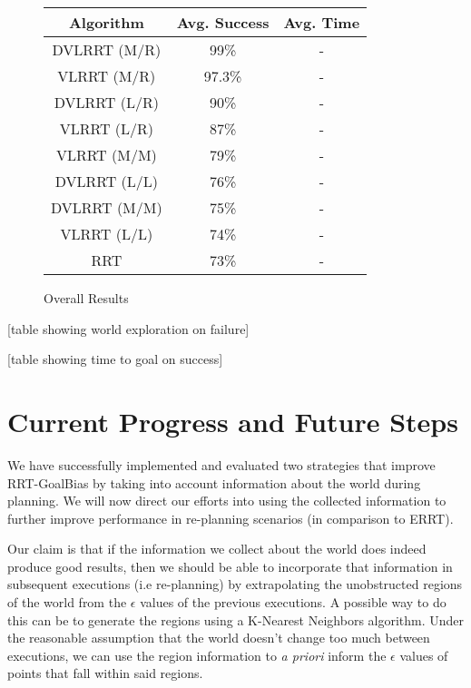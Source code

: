 \documentclass[10pt,twoside,twocolumn]{article}
\begin{document}
\begin{figure}[tp]
\small{
\begin{tabular}{|ccc|}
\hline
Algorithm & Avg. Success & Avg. Time\\
\hline
DVLRRT (M/R) & 99\% & -\\
VLRRT (M/R) & 97.3\% & -\\
DVLRRT (L/R) & 90\% & -\\
VLRRT (L/R) & 87\% & -\\
VLRRT (M/M) & 79\% & -\\
DVLRRT (L/L) & 76\% & -\\
DVLRRT (M/M) & 75\% & -\\
VLRRT (L/L) & 74\% & -\\
RRT & 73\% & -\\
\hline
\end{tabular}}
\caption{Overall Results}
\end{figure}


[table showing world exploration on failure]

[table showing time to goal on success]

\section{Current Progress and Future Steps}

We have successfully implemented and evaluated two strategies that improve RRT-GoalBias by
taking into account information about the world during planning. We will now
direct our efforts into using the collected information to further improve performance
in re-planning scenarios (in comparison to ERRT). 

Our claim is that if the information we collect
about the world does indeed produce good results, then we should be able to incorporate that
information in subsequent executions (i.e re-planning) by extrapolating the unobstructed regions of
the world from the $\epsilon$ values of the previous executions. A possible way to do this can be
to generate the regions using a K-Nearest Neighbors algorithm. Under the reasonable assumption
that the world doesn't change too much between executions, we can use the region information to
\emph{a priori} inform the $\epsilon$ values of points that fall within said regions.


{}

\end{document}

